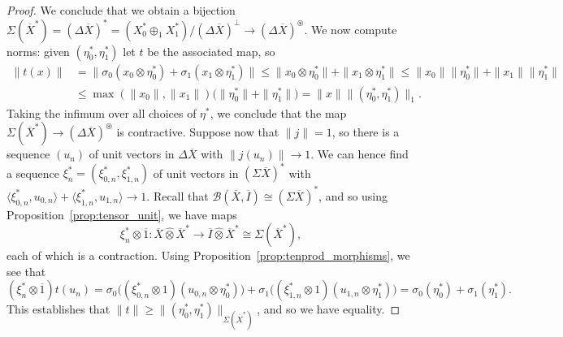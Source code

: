 \documentclass[a4paper,11pt]{article}
\theoremstyle{plain}
\theoremstyle{remark}
\newcommand{\mc}[1]{\mathcal{#1}}
\newcommand{\ip}[2]{{\langle {#1} , {#2} \rangle}}
\newcommand{\proten}{\widehat\otimes}
\newcommand{\intdual}{\circledast}
\begin{document}
\begin{proof}
We conclude that we obtain a bijection $\Sigma(\overline X^*) = (\Delta\overline X)^* = (X_0^* \oplus_1 X_1^*) / (\Delta\overline X)^\perp \to (\Delta\overline X)^\intdual$.  We now compute norms: given $(\eta_0^*, \eta_1^*)$ let $t$ be the associated map, so
\begin{align*}
\|t(x)\| &= \| \sigma_0(x_0\otimes\eta_0^*) + \sigma_1(x_1\otimes\eta_1^*) \|
\leq \|x_0\otimes\eta_0^*\| + \|x_1\otimes\eta_1^*\|
\leq \|x_0\|\|\eta_0^*\| + \|x_1\|\|\eta_1^*\|   \\
&\leq \max(\|x_0\|, \|x_1\|) \big( \|\eta_0^*\| + \|\eta_1^*\| \big)
= \|x\| \| (\eta_0^*, \eta_1^*) \|_1.
\end{align*}
Taking the infimum over all choices of $\eta^*$, we conclude that the map $\Sigma(\overline X^*) \to (\Delta\overline X)^\intdual$ is contractive.  Suppose now that $\|j\|=1$, so there is a sequence $(u_n)$ of unit vectors in $\Delta\overline X$ with $\|j(u_n)\| \to 1$.  We can hence find a sequence $\xi_n^* = (\xi_{0,n}^*, \xi_{1,n}^*)$ of unit vectors in $(\Sigma\overline X)^*$ with $\ip{\xi_{0,n}^*}{u_{0,n}} + \ip{\xi_{1,n}^*}{u_{1,n}} \to 1$.  Recall that $\mc B(\overline X,\overline I) \cong (\Sigma\overline X)^*$, and so using Proposition~\ref{prop:tensor_unit}, we have maps
\[ \xi_n^* \otimes \overline 1 \colon \overline X \proten \overline X^*
\to \overline I \proten \overline X^* \cong \Sigma(\overline X^*), \]
each of which is a contraction.  Using Proposition~\ref{prop:tenprod_morphisms}, we see that
\[ (\xi_n^* \otimes \overline 1) t (u_n)
= \sigma_0\big( (\xi_{0,n}^*\otimes 1)(u_{0,n}\otimes \eta_0^*) \big) + 
\sigma_1\big( (\xi_{1,n}^*\otimes 1)(u_{1,n}\otimes \eta_1^*) \big)
= \sigma_0(\eta_0^*) + \sigma_1(\eta_1^*). \]
This establishes that $\|t\| \geq \|(\eta_0^*, \eta_1^*)\|_{\Sigma(\overline X^*)}$, and so we have equality.
\end{proof}
\end{document}
